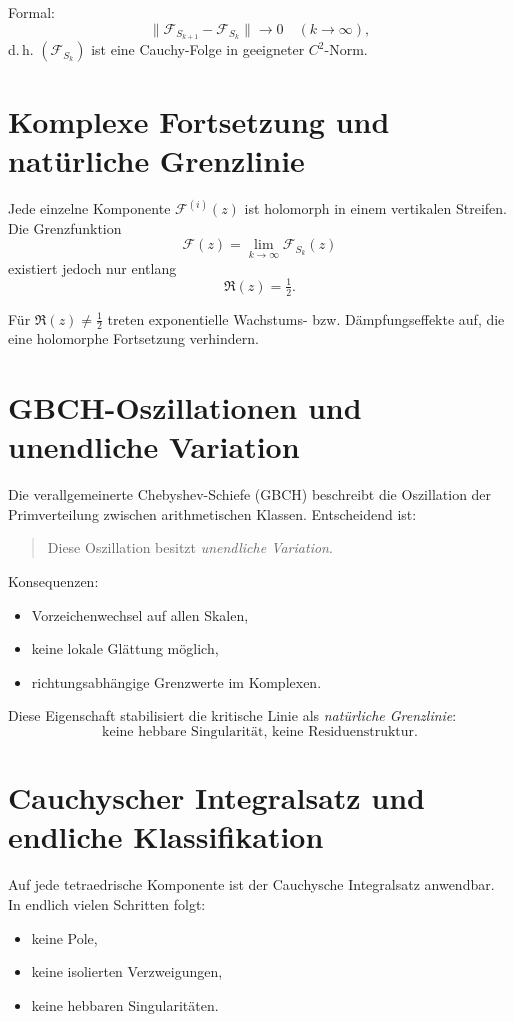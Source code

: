 \documentclass[11pt,a4paper]{article}
\begin{document}
Formal:
\[
\|\mathcal F_{S_{k+1}}-\mathcal F_{S_k}\|\to 0 \quad (k\to\infty),
\]
d.\,h. $(\mathcal F_{S_k})$ ist eine Cauchy-Folge in geeigneter $C^2$-Norm.

\section{Komplexe Fortsetzung und natürliche Grenzlinie}

Jede einzelne Komponente $\mathcal F^{(i)}(z)$ ist holomorph in einem vertikalen Streifen.
Die Grenzfunktion
\[
\mathcal F(z)=\lim_{k\to\infty}\mathcal F_{S_k}(z)
\]
existiert jedoch nur entlang
\[
\Re(z)=\tfrac12.
\]

Für $\Re(z)\neq\tfrac12$ treten exponentielle Wachstums- bzw. Dämpfungseffekte auf, die eine holomorphe Fortsetzung verhindern.

\section{GBCH-Oszillationen und unendliche Variation}

Die verallgemeinerte Chebyshev-Schiefe (GBCH) beschreibt die Oszillation der Primverteilung zwischen arithmetischen Klassen.
Entscheidend ist:
\begin{quote}
Diese Oszillation besitzt \emph{unendliche Variation}.
\end{quote}

Konsequenzen:
\begin{itemize}
\item Vorzeichenwechsel auf allen Skalen,
\item keine lokale Glättung möglich,
\item richtungsabhängige Grenzwerte im Komplexen.
\end{itemize}

Diese Eigenschaft stabilisiert die kritische Linie als \emph{natürliche Grenzlinie}:
\[
\text{keine hebbare Singularität, keine Residuenstruktur}.
\]

\section{Cauchyscher Integralsatz und endliche Klassifikation}

Auf jede tetraedrische Komponente ist der Cauchysche Integralsatz anwendbar.
In endlich vielen Schritten folgt:
\begin{itemize}
\item keine Pole,
\item keine isolierten Verzweigungen,
\item keine hebbaren Singularitäten.
\end{itemize}
\end{document}

